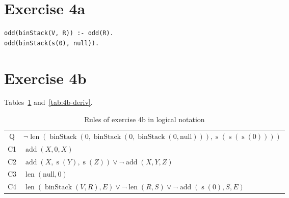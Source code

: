 \documentclass[11pt]{article}
\DeclareMathOperator*{\s}{s}
\DeclareMathOperator*{\binStack}{binStack}
\DeclareMathOperator*{\add}{add}
\DeclareMathOperator*{\len}{len}
\newcommand{\Null}{\text{null}}
\begin{document}
%
\section{Exercise 4a}
%
\lstset{language=prolog}
\begin{lstlisting}
odd(binStack(V, R)) :- odd(R).
odd(binStack(s(0), null)).
\end{lstlisting}
%
\section{Exercise 4b}
%
Tables~\ref{tab:4b-def} and~\ref{tab:4b-deriv}.
\begin{table}[h]
  \begin{tabular}{cl}
    Q   & $\neg \len(\binStack(0, \binStack(0, \binStack(0, \Null))), \s(\s(\s(0))))$ \\
    C1  & $\add(X, 0, X)$ \\
    C2  & $\add(X, \s(Y), \s(Z)) \lor \neg \add(X, Y, Z)$ \\
    C3  & $\len(\Null, 0)$ \\
    C4  & $\len(\binStack(V, R), E) \lor \neg \len(R, S) \lor \neg \add(\s(0), S, E)$
  \end{tabular}
  \caption{Rules of exercise 4b in logical notation}
  \label{tab:4b-def}
\end{table}
%
\end{document}
